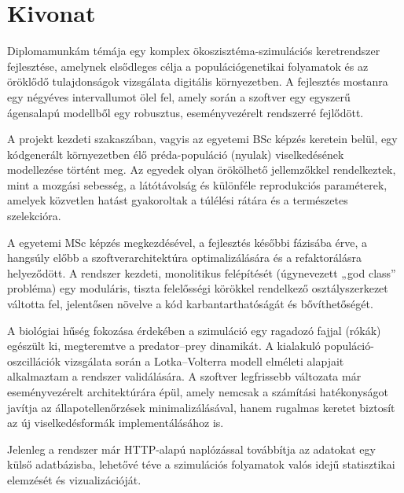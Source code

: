 \setcounter{page}{1}

\selecthungarian

\chapter*{Kivonat}

\noindent Diplomamunkám témája egy komplex ökoszisztéma-szimulációs keretrendszer fejlesztése, amelynek elsődleges célja a populációgenetikai folyamatok és az öröklődő tulajdonságok vizsgálata digitális környezetben. A fejlesztés mostanra egy négyéves intervallumot ölel fel, amely során a szoftver egy egyszerű ágensalapú modellből egy robusztus, eseményvezérelt rendszerré fejlődött.

A projekt kezdeti szakaszában, vagyis az egyetemi BSc képzés keretein belül, egy kódgenerált környezetben élő préda-populáció (nyulak) viselkedésének modellezése történt meg. Az egyedek olyan örökölhető jellemzőkkel rendelkeztek, mint a mozgási sebesség, a látótávolság és különféle reprodukciós paraméterek, amelyek közvetlen hatást gyakoroltak a túlélési rátára és a természetes szelekcióra.

A egyetemi MSc képzés megkezdésével, a fejlesztés későbbi fázisába érve, a hangsúly előbb a szoftverarchitektúra optimalizálására és a refaktorálásra helyeződött. A rendszer kezdeti, monolitikus felépítését (úgynevezett „god class” probléma) egy moduláris, tiszta felelősségi körökkel rendelkező osztályszerkezet váltotta fel, jelentősen növelve a kód karbantarthatóságát és bővíthetőségét.

A biológiai hűség fokozása érdekében a szimuláció egy ragadozó fajjal (rókák) egészült ki, megteremtve a predator–prey dinamikát. A kialakuló populáció-oszcillációk vizsgálata során a Lotka–Volterra modell elméleti alapjait alkalmaztam a rendszer validálására. A szoftver legfrissebb változata már eseményvezérelt architektúrára épül, amely nemcsak a számítási hatékonyságot javítja az állapotellenőrzések minimalizálásával, hanem rugalmas keretet biztosít az új viselkedésformák implementálásához is.

Jelenleg a rendszer már HTTP-alapú naplózással továbbítja az adatokat egy külső adatbázisba, lehetővé téve a szimulációs folyamatok valós idejű statisztikai elemzését és vizualizációját.

